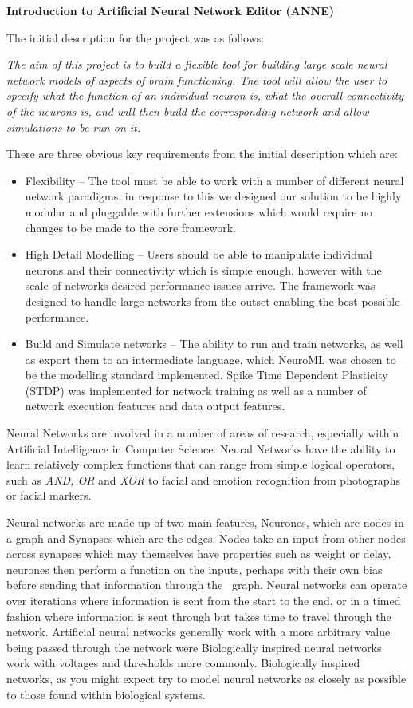 \documentclass[12pt,twoside]{article}
\begin{document}
{\bfseries
Introduction to Artificial Neural Network Editor (ANNE)}


\bigskip

{
The initial description for the project was as follows:

{\textit{
The aim of this project is to build a flexible tool for building large
scale neural network models of aspects of brain functioning. The tool
will allow the user to specify what the function of an individual
neuron is, what the overall connectivity of the neurons is, and will
then build the corresponding network and allow simulations to be run on
it.}}

There are three obvious key requirements from the initial description
which are:

\begin{itemize}
\item 
{
Flexibility {--} The tool must be able to work with a number of
different neural network paradigms, in response to this we designed our
solution to be highly modular and pluggable with further extensions
which would require no changes to be made to the core framework.
}
\item 
{
High Detail Modelling {--} Users should be able to manipulate individual
neurons and their connectivity which is simple enough, however with the
scale of networks desired performance issues arrive. The framework was
designed to handle large networks from the outset enabling the best
possible performance.
}
\item 
{
Build and Simulate networks {--} The ability to run and train networks,
as well as export them to an intermediate language, which NeuroML was
chosen to be the modelling standard implemented. Spike Time Dependent
Plasticity (STDP) was implemented for network training as well as a
number of network execution features and data output features.
}
\end{itemize}

Neural Networks are involved in a number of areas of
research, especially within Artificial Intelligence in Computer
Science. Neural Networks have the ability to learn relatively complex
functions that can range from simple logical operators, such as
{\textit{AND, OR}} and
{\textit{XOR}} to facial and emotion
recognition from photographs or facial markers.

Neural networks are made up of two main features, Neurones, which are
nodes in a graph and Synapses which are the edges. Nodes take an input
from other nodes across synapses which may themselves have properties
such as weight or delay, neurones then perform a function on the
inputs, perhaps with their own bias before sending that information
through the \ graph. Neural networks can operate over iterations where
information is sent from the start to the end, or in a timed fashion
where information is sent through but takes time to travel through the
network. Artificial neural networks generally work with a more
arbitrary value being passed through the network were Biologically
inspired neural networks work with voltages and thresholds more
commonly. Biologically inspired networks, as you might expect try to
model neural networks as closely as possible to those found within
biological systems.

}
\end{document}
